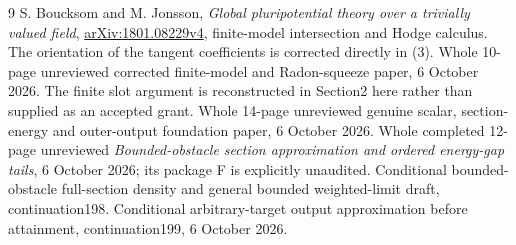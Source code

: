 \documentclass[11pt]{article}
\begin{document}
\begin{thebibliography}{9}\small
{} S. Boucksom and M. Jonsson,
\emph{Global pluripotential theory over a trivially valued field},
\href{https://arxiv.org/pdf/1801.08229v4}{arXiv:1801.08229v4},
finite-model intersection and Hodge calculus. The orientation of the
tangent coefficients is corrected directly in (3).
 Whole 10-page unreviewed corrected finite-model and
Radon-squeeze paper, 6 October 2026. The finite slot argument is
reconstructed in Section2 here rather than supplied as an accepted grant.
 Whole 14-page unreviewed genuine scalar,
section-energy and outer-output foundation paper, 6 October 2026.
 Whole completed 12-page unreviewed
\emph{Bounded-obstacle section approximation and ordered energy-gap tails},
6 October 2026; its package F is explicitly unaudited.
 Conditional bounded-obstacle full-section density
and general bounded weighted-limit draft, continuation198.
 Conditional arbitrary-target output approximation
before attainment, continuation199, 6 October 2026.
\end{thebibliography}
\end{document}
